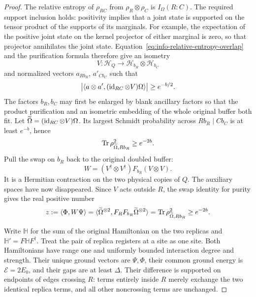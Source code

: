 \begin{proof}
The relative entropy of $\rho_{RC}$ from
$\rho_R\otimes\rho_C$ is $I_\Omega(R:C)$.  The required support
inclusion holds: positivity implies that a joint state is supported
on the tensor product of the supports of its marginals.  For example,
the expectation of the positive joint state on the kernel projector
of either marginal is zero, so that projector annihilates the joint
state.  Equation~\eqref{eq:info-relative-entropy-overlap} and the
purification formula therefore give an isometry
\[
 V:\mathcal H_Q\longrightarrow\mathcal H_{b_R}\otimes\mathcal H_{b_C}
\]
and normalized vectors $a_{Rb_R}$, $a'_{Cb_C}$ such that
\begin{equation}
 \bigl|\langle a\otimes a',(\operatorname{id}_{RC}\otimes V)\Omega\rangle\bigr|
       \ge e^{-b/2}.
 \label{eq:info-split-overlap}
\end{equation}
The factors $b_R,b_C$ may first be enlarged by blank ancillary factors
so that the product purification and an isometric embedding of the
whole original buffer both fit.  Let
$\widetilde\Omega=(\operatorname{id}_{RC}\otimes V)\Omega$.
Its largest Schmidt probability across $Rb_R\mid Cb_C$ is at least
$e^{-b}$, hence
\[
 \operatorname{Tr}\rho_{\widetilde\Omega,Rb_R}^{2}\ge e^{-2b}.
\]
Pull the swap on $b_R$ back to the original doubled buffer:
\[
 W=(V^\dagger\otimes V^\dagger)F_{b_R}(V\otimes V).
\]
It is a Hermitian contraction on the two physical copies of $Q$.
The auxiliary spaces have now disappeared.  Since $V$ acts outside
$R$, the swap identity for purity gives the real positive number
\begin{equation}
 z:=\langle\Phi,W\Psi\rangle
   =\langle\widetilde\Omega^{\otimes2},
          F_RF_{b_R}\widetilde\Omega^{\otimes2}\rangle
   =\operatorname{Tr}\rho_{\widetilde\Omega,Rb_R}^{2}
   \ge e^{-2b}.
 \label{eq:info-reset-overlap}
\end{equation}

Write $\mathbb H$ for the sum of the original Hamiltonian on the two
replicas and $\mathbb H'=F\mathbb H F^\dagger$.  Treat the pair of
replica registers at a site as one site.  Both Hamiltonians have range
one and uniformly bounded interaction degree and strength.  Their
unique ground vectors are $\Psi,\Phi$, their common ground energy is
$\mathcal E=2E_0$, and their gaps are at least $\Delta$.  Their
difference is supported on endpoints of edges crossing $R$: terms
entirely inside $R$ merely exchange the two identical replica terms,
and all other noncrossing terms are unchanged.


\end{proof}
